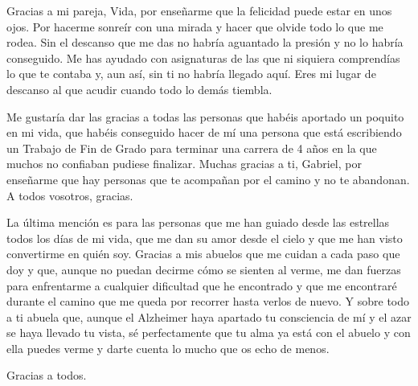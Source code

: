 Gracias a mi pareja, Vida, por enseñarme que la felicidad puede estar en unos ojos. Por hacerme sonreír con una mirada y hacer que olvide todo lo que me rodea. Sin el descanso que me das no habría aguantado la presión y no lo habría conseguido. Me has ayudado con asignaturas de las que ni siquiera comprendías lo que te contaba y, aun así, sin ti no habría llegado aquí. Eres mi lugar de descanso al que acudir cuando todo lo demás tiembla.

Me gustaría dar las gracias a todas las personas que habéis aportado un poquito en mi vida, que habéis conseguido hacer de mí una persona que está escribiendo un Trabajo de Fin de Grado para terminar una carrera de 4 años en la que muchos no confiaban pudiese finalizar. Muchas gracias a ti, Gabriel, por enseñarme que hay personas que te acompañan por el camino y no te abandonan. A todos vosotros, gracias.

La última mención es para las personas que me han guiado desde las estrellas todos los días de mi vida, que me dan su amor desde el cielo y que me han visto convertirme en quién soy. Gracias a mis abuelos que me cuidan a cada paso que doy y que, aunque no puedan decirme cómo se sienten al verme, me dan fuerzas para enfrentarme a cualquier dificultad que he encontrado y que me encontraré durante el camino que me queda por recorrer hasta verlos de nuevo. Y sobre todo a ti abuela que, aunque el Alzheimer haya apartado tu consciencia de mí y el azar se haya llevado tu vista, sé perfectamente que tu alma ya está con el abuelo y con ella puedes verme y darte cuenta lo mucho que os echo de menos.

Gracias a todos.
\restoregeometry
